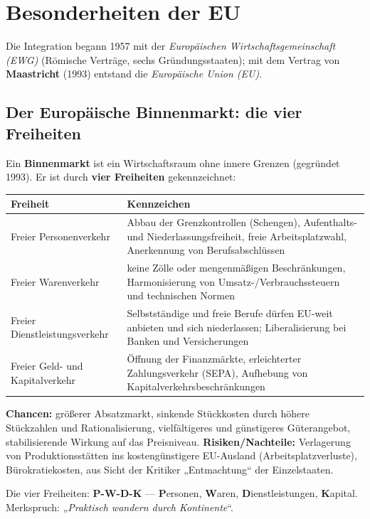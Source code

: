 \documentclass[11pt, a4paper]{article}
\begin{document}
\section{Besonderheiten der EU}

Die Integration begann 1957 mit der \emph{Europäischen Wirtschaftsgemeinschaft (EWG)}
(Römische Verträge, sechs Gründungsstaaten); mit dem Vertrag von \textbf{Maastricht} (1993)
entstand die \emph{Europäische Union (EU)}.

\subsection{Der Europäische Binnenmarkt: die vier Freiheiten}

Ein \textbf{Binnenmarkt} ist ein Wirtschaftsraum ohne innere Grenzen (gegründet 1993). Er
ist durch \textbf{vier Freiheiten} gekennzeichnet:

\begin{center}
\begin{tabular}{p{4.2cm} p{9.6cm}}
\toprule
\textbf{Freiheit} & \textbf{Kennzeichen}\\
\midrule
Freier Personenverkehr & Abbau der Grenzkontrollen (Schengen), Aufenthalts- und Niederlassungsfreiheit, freie Arbeitsplatzwahl, Anerkennung von Berufsabschlüssen\\
Freier Warenverkehr & keine Zölle oder mengenmäßigen Beschränkungen, Harmonisierung von Umsatz-/Verbrauchssteuern und technischen Normen\\
Freier Dienstleistungsverkehr & Selbstständige und freie Berufe dürfen EU-weit anbieten und sich niederlassen; Liberalisierung bei Banken und Versicherungen\\
Freier Geld- und Kapitalverkehr & Öffnung der Finanzmärkte, erleichterter Zahlungsverkehr (SEPA), Aufhebung von Kapitalverkehrsbeschränkungen\\
\bottomrule
\end{tabular}
\end{center}

\textbf{Chancen:} größerer Absatzmarkt, sinkende Stückkosten durch höhere Stückzahlen und
Rationalisierung, vielfältigeres und günstigeres Güterangebot, stabilisierende Wirkung auf
das Preisniveau. \textbf{Risiken/Nachteile:} Verlagerung von Produktionsstätten ins
kostengünstigere EU-Ausland (Arbeitsplatzverluste), Bürokratiekosten, aus Sicht der
Kritiker „Entmachtung`` der Einzelstaaten.

\begin{eselsbruecke}
Die vier Freiheiten: \textbf{P-W-D-K} --- \textbf{P}ersonen, \textbf{W}aren,
\textbf{D}ienstleistungen, \textbf{K}apital. Merkspruch: „\emph{Praktisch wandern durch
Kontinente}``.
\end{eselsbruecke}
\end{document}
